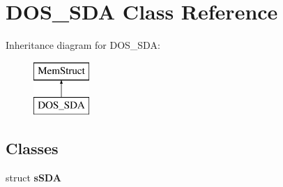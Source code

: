 \hypertarget{classDOS__SDA}{\section{D\-O\-S\-\_\-\-S\-D\-A Class Reference}
\label{classDOS__SDA}
}
Inheritance diagram for D\-O\-S\-\_\-\-S\-D\-A\-:\begin{figure}[H]
\begin{center}
\leavevmode
\includegraphics[height=2.000000cm]{classDOS__SDA}
\end{center}
\end{figure}
\subsection*{Classes}
\begin{DoxyCompactItemize}
\item 
struct {\bfseries s\-S\-D\-A}
\end{DoxyCompactItemize}
